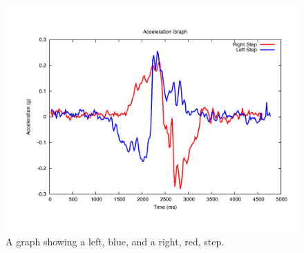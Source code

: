 \begin{figure}[H]
	\centering	
	\includegraphics[scale=0.45, trim=0cm 2cm 0cm 2cm]{media/gnuplot/tokew.pdf}
	\caption{A graph showing a left, blue, and a right, red, step.}
	\label{figure:step-left-and-right}
\end{figure}



